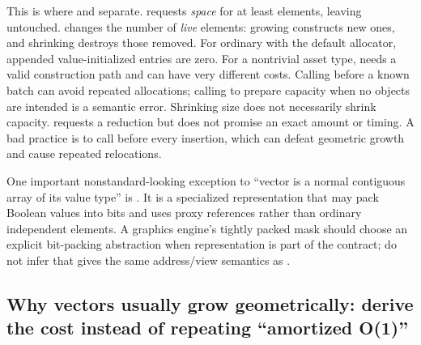 This is where  and  separate.  requests \emph{space} for at least  elements, leaving  untouched.  changes the number of \emph{live} elements: growing constructs new ones, and shrinking destroys those removed. For ordinary  with the default allocator, appended value-initialized entries are zero. For a nontrivial asset type,  needs a valid construction path and can have very different costs. Calling  before a known batch can avoid repeated allocations; calling  to prepare capacity when no objects are intended is a semantic error. Shrinking size does not necessarily shrink capacity.  requests a reduction but does not promise an exact amount or timing. A bad practice is to call  before every insertion, which can defeat geometric growth and cause repeated relocations.

One important nonstandard-looking exception to ``vector is a normal contiguous array of its value type'' is . It is a specialized representation that may pack Boolean values into bits and uses proxy references rather than ordinary independent  elements. A graphics engine's tightly packed mask should choose an explicit bit-packing abstraction when representation is part of the contract; do not infer that  gives the same address/view semantics as .

\subsection{Why vectors usually grow geometrically: derive the cost instead of repeating ``amortized O(1)''}\label{05-engine-i-ch005-why-vectors-usually-grow-geometrically-derive-the-cost-instead-of-repeating-amortized-o1}

